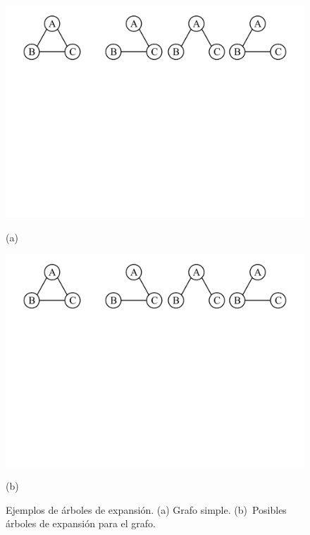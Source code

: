 \begin{figure}%
    	\centering
    	\begin{minipage}{0.25\textwidth}
    		\centering
    		\includegraphics[scale=.4, clip,  trim=50 440 630 20]{img/arte/graphs-spanningTree.pdf}
    		
    		(a)
    	\end{minipage}
    	\begin{minipage}{0.65\textwidth}
    		\centering
    		\includegraphics[scale=.4, clip, trim=280 440 50 20]{img/arte/graphs-spanningTree.pdf}
    		
    		(b)
    	\end{minipage}

    \caption{Ejemplos de árboles de expansión. (a) Grafo simple. (b)~Posibles árboles de expansión para el grafo.}
    \label{fig:spanningTree}
\end{figure}
